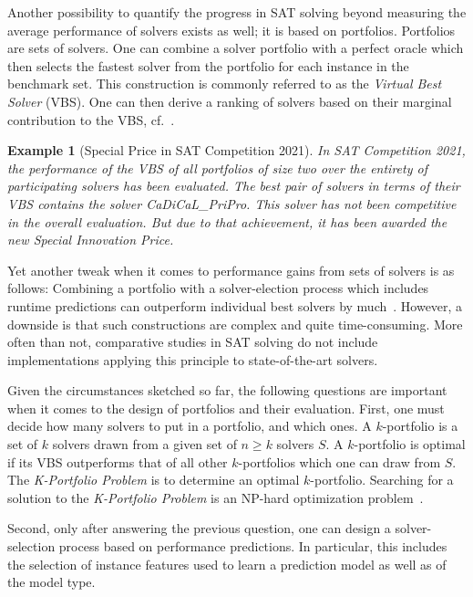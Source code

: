\documentclass[conference]{IEEEtran}
\newtheorem{example}{Example}
\begin{document}
Another possibility to quantify the progress in SAT solving beyond measuring the average performance of solvers exists as well; it is based on portfolios. 
Portfolios are sets of solvers.  
One can combine a solver portfolio with a perfect oracle which then selects the fastest solver from the portfolio for each instance in the benchmark set. 
This construction is commonly referred to as the \emph{Virtual Best Solver} (VBS). 
One can then derive a ranking of solvers based on their marginal contribution to the VBS, cf.~\cite{Xu:2012:EvalContribVBS}. 

\begin{example}[Special Price in SAT Competition 2021]
In SAT Competition 2021, the performance of the VBS of all portfolios of size two over the entirety of participating solvers has been evaluated. 
The best pair of solvers in terms of their VBS contains the solver \emph{CaDiCaL\_PriPro}.
This solver has not been competitive in the overall evaluation.
But due to that achievement, it has been awarded the new \emph{Special Innovation Price}.
\end{example}

Yet another tweak when it comes to performance gains from sets of solvers is as follows:
Combining a portfolio with a solver-election process which includes runtime predictions can outperform individual best solvers by much~\cite{xu2008satzilla}. 
However, a downside is that such constructions are complex and quite time-consuming. 
More often than not, comparative studies in SAT solving do not include implementations applying this principle to state-of-the-art solvers.

Given the circumstances sketched so far, the following questions are important when it comes to the design of portfolios and their evaluation. 
First, one must decide how many solvers to put in a portfolio, and which ones. 
A $k$-portfolio is a set of $k$ solvers drawn from a given set of $n \geq k$ solvers $S$. 
A $k$-portfolio is optimal if its VBS outperforms that of all other $k$-portfolios which one can draw from $S$. 
The \emph{K-Portfolio Problem} is to determine an optimal $k$-portfolio. 
Searching for a solution to the \emph{K-Portfolio Problem} is an NP-hard optimization problem~\cite{nof2020real}. 

Second, only after answering the previous question, one can design a solver-selection process based on performance predictions. 
In particular, this includes the selection of instance features used to learn a prediction model as well as of the model type. 
\end{document}
